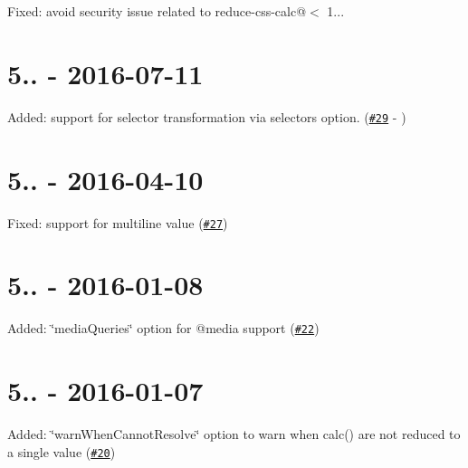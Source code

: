 
\begin{DoxyItemize}
\item Fixed\+: avoid security issue related to {\ttfamily reduce-\/css-\/calc@$<$ 1..}.
\end{DoxyItemize}

\section*{5.. -\/ 2016-\/07-\/11}


\begin{DoxyItemize}
\item Added\+: support for selector transformation via {\ttfamily selectors} option. (\href{https://github.com/postcss/postcss-calc/pull/29}{\tt \#29} -\/ )
\end{DoxyItemize}

\section*{5.. -\/ 2016-\/04-\/10}


\begin{DoxyItemize}
\item Fixed\+: support for multiline value (\href{https://github.com/postcss/postcss-calc/pull/27}{\tt \#27}) 
\end{DoxyItemize}

\section*{5.. -\/ 2016-\/01-\/08}


\begin{DoxyItemize}
\item Added\+: \char`\"{}media\+Queries\char`\"{} option for {\ttfamily @media} support (\href{https://github.com/postcss/postcss-calc/pull/22}{\tt \#22})
\end{DoxyItemize}

\section*{5.. -\/ 2016-\/01-\/07}


\begin{DoxyItemize}
\item Added\+: \char`\"{}warn\+When\+Cannot\+Resolve\char`\"{} option to warn when calc() are not reduced to a single value (\href{https://github.com/postcss/postcss-calc/pull/20}{\tt \#20})
\end{DoxyItemize}

